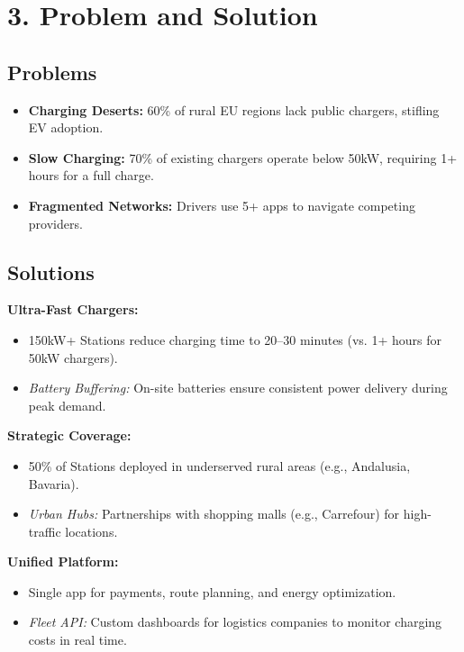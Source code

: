 \section{3. Problem and Solution}

\subsection*{Problems}
\begin{itemize}
    \item \textbf{Charging Deserts:} 60\% of rural EU regions lack public chargers, stifling EV adoption.
    \item \textbf{Slow Charging:} 70\% of existing chargers operate below 50kW, requiring 1+ hours for a full charge.
    \item \textbf{Fragmented Networks:} Drivers use 5+ apps to navigate competing providers.
\end{itemize}

\subsection*{Solutions}
\textbf{Ultra-Fast Chargers:}
\begin{itemize}
    \item 150kW+ Stations reduce charging time to 20--30 minutes (vs. 1+ hours for 50kW chargers).
    \item \textit{Battery Buffering:} On-site batteries ensure consistent power delivery during peak demand.
\end{itemize}

\textbf{Strategic Coverage:}
\begin{itemize}
    \item 50\% of Stations deployed in underserved rural areas (e.g., Andalusia, Bavaria).
    \item \textit{Urban Hubs:} Partnerships with shopping malls (e.g., Carrefour) for high-traffic locations.
\end{itemize}

\textbf{Unified Platform:}
\begin{itemize}
    \item Single app for payments, route planning, and energy optimization.
    \item \textit{Fleet API:} Custom dashboards for logistics companies to monitor charging costs in real time.
\end{itemize}
